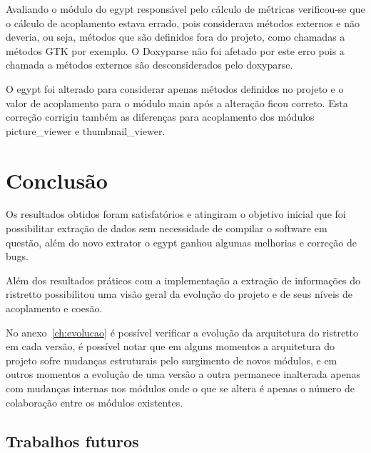 Avaliando o módulo do egypt responsável pelo cálculo de métricas verificou-se
que o cálculo de acoplamento estava errado, pois considerava métodos externos e
não deveria, ou seja, métodos que são definidos fora do projeto, como chamadas
a métodos GTK por exemplo. O Doxyparse não foi
afetado por este erro pois a chamada a métodos externos são desconsiderados
pelo doxyparse.

O egypt foi alterado para considerar apenas métodos definidos no projeto e o
valor de acoplamento para o módulo main após a alteração ficou correto. Esta
correção corrigiu também as diferenças para acoplamento dos módulos
picture\_viewer e thumbnail\_viewer.


\chapter{Conclusão} \label{ch:conclusao}

Os resultados obtidos foram satisfatórios e atingiram o objetivo inicial que
foi possibilitar extração de dados sem necessidade de compilar o software em
questão, além do novo extrator o egypt ganhou algumas melhorias e correção de
bugs.

Além dos resultados práticos com a implementação a extração de informações do
ristretto possibilitou uma visão geral da evolução do projeto e de seus níveis
de acoplamento e coesão.

No anexo~\ref{ch:evolucao} é possível verificar a evolução da arquitetura do
ristretto em cada versão, é possível notar que em alguns momentos a arquitetura
do projeto sofre mudanças estruturais pelo surgimento de novos módulos, e em
outros momentos a evolução de uma versão a outra permanece inalterada apenas
com mudanças internas nos módulos onde o que se altera é apenas o número de
colaboração entre os módulos existentes.

\section{Trabalhos futuros}

